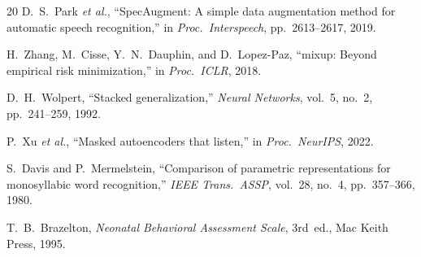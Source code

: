 \documentclass[11pt,a4paper]{article}
\begin{document}
\begin{thebibliography}{20}
D.~S.~Park \textit{et al.},
``SpecAugment: A simple data augmentation method for automatic speech
recognition,''
in \textit{Proc.\ Interspeech}, pp.~2613--2617, 2019.

H.~Zhang, M.~Cisse, Y.~N.~Dauphin, and D.~Lopez-Paz,
``mixup: Beyond empirical risk minimization,''
in \textit{Proc.\ ICLR}, 2018.

D.~H.~Wolpert,
``Stacked generalization,''
\textit{Neural Networks}, vol.~5, no.~2, pp.~241--259, 1992.

P.~Xu \textit{et al.},
``Masked autoencoders that listen,''
in \textit{Proc.\ NeurIPS}, 2022.

S.~Davis and P.~Mermelstein,
``Comparison of parametric representations for monosyllabic word
recognition,''
\textit{IEEE Trans.\ ASSP}, vol.~28, no.~4, pp.~357--366, 1980.

T.~B.~Brazelton,
\textit{Neonatal Behavioral Assessment Scale},
3rd~ed., Mac Keith Press, 1995.

\end{thebibliography}
\end{document}
